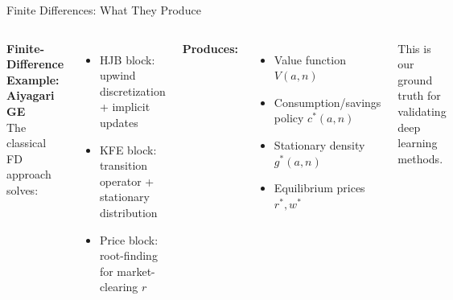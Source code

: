 \documentclass[aspectratio=169,11pt]{beamer}
\newcommand{\emphc}[1]{\textcolor{harvardcrimson}{#1}}
\begin{document}
\begin{frame}[shrink=2]{Finite Differences: What They Produce}
\small
\begin{columns}[T]
\textbf{Finite-Difference Example: Aiyagari GE}\\[1pt]
The classical FD approach solves:
\begin{itemize}\itemsep1pt
    \item HJB block: upwind discretization + implicit updates
    \item KFE block: transition operator + stationary distribution
    \item Price block: root-finding for market-clearing $r$
\end{itemize}

\vspace{0.2em}
\textbf{Produces:}
\begin{itemize}\itemsep1pt
    \item Value function $V(a, n)$
    \item Consumption/savings policy $c^*(a, n)$
    \item Stationary density $g^*(a, n)$
    \item Equilibrium prices $r^*, w^*$
\end{itemize}

\vspace{0.2em}
{\small \emphc{This is our ground truth} for validating deep learning methods.}

\begin{center}


\end{center}
\end{columns}
\end{frame}
\end{document}
